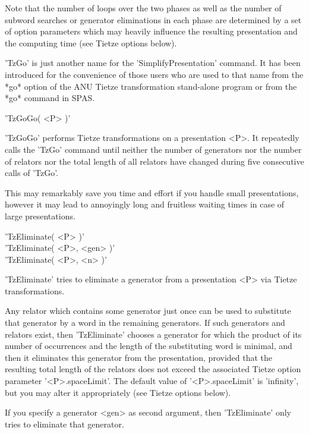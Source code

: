 Note that the number  of loops over the two phases as well  as the number
of  subword   searches  or  generator  eliminations  in  each  phase  are
determined by a set of option parameters which may  heavily influence the
resulting presentation and the computing time (see Tietze options below).

'TzGo' is just another name  for the  'SimplifyPresentation' command.  It
has  been introduced for  the convenience  of those {\GAP} users  who are
used to  that  name from the *go* option of the ANU Tietze transformation
stand-alone program or from the *go* command in SPAS.

\vspace{5mm}
'TzGoGo( <P> )'%

'TzGoGo'  performs  Tietze  transformations  on  a presentation  <P>.  It
repeatedly   calls  the  'TzGo'  command  until  neither  the  number  of
generators  nor  the number  of relators  nor  the total  length  of  all
relators have changed during five consecutive calls of 'TzGo'.

This  may  remarkably  save  you  time  and effort  if you  handle  small
presentations, however it may  lead  to  annoyingly  long  and  fruitless
waiting times in case of large presentations.

\vspace{5mm}
'TzEliminate( <P> )'%
 \\
'TzEliminate( <P>, <gen> )' \\
'TzEliminate( <P>, <n> )'

'TzEliminate' tries to eliminate a generator from a  presentation <P> via
Tietze transformations.

Any  relator which  contains  some generator just  once  can be  used  to
substitute that generator by a word in the remaining generators.  If such
generators and relators exist, then 'TzEliminate' chooses a generator for
which  the product of  its number  of occurrences and  the length  of the
substituting word is minimal, and  then it eliminates this generator from
the  presentation, provided  that  the  resulting  total  length  of  the
relators  does   not  exceed  the  associated  Tietze  option   parameter
'<P>.spaceLimit'.   The default value of '<P>.spaceLimit'  is 'infinity',
but you may alter it appropriately (see Tietze options below).

If you specify a generator <gen> as  second argument, then  'TzEliminate'
only tries to eliminate that generator.

